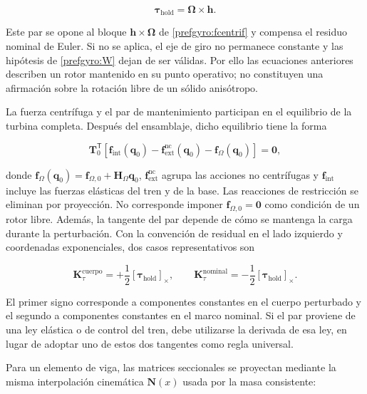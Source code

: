 \begin{equation}
 \bm\tau_{\mathrm{hold}}=\bm\Omega\times\bm h.
 \label{prefgyro:holding}
\end{equation}

Este par se opone al bloque $\bm h\times\bm\Omega$ de
\eqref{prefgyro:fcentrif} y compensa el residuo nominal de Euler. Si no se
aplica, el eje de giro no permanece constante y las hipótesis de
\eqref{prefgyro:W} dejan de ser
válidas. Por ello las ecuaciones anteriores describen un rotor mantenido en su
punto operativo; no constituyen una afirmación sobre la rotación libre de un
sólido anisótropo.

La fuerza centrífuga y el par de mantenimiento participan en el equilibrio de
la turbina completa. Después del ensamblaje, dicho equilibrio tiene la forma

\begin{equation}
 \bm T_0^{\mathsf T}\left[
 \bm f_{\mathrm{int}}(\bm q_0)
 -\bm f_{\mathrm{ext}}^{\mathrm{nc}}(\bm q_0)
 -\bm f_{\Omega}(\bm q_0)\right]=\bm 0,
 \label{prefgyro:equilibrio-nominal}
\end{equation}

donde $\bm f_{\Omega}(\bm q_0)=\bm f_{\Omega,0}+\bm H_\Omega\bm q_0$,
$\bm f_{\mathrm{ext}}^{\mathrm{nc}}$ agrupa las acciones no centrífugas y
$\bm f_{\mathrm{int}}$ incluye las fuerzas elásticas del tren y de la base.
Las reacciones de restricción se eliminan por proyección. No corresponde imponer
$\bm f_{\Omega,0}=\bm 0$ como condición de un rotor libre. Además, la tangente
del par depende de cómo se mantenga la carga durante la perturbación. Con la
convención de residual en el lado izquierdo y coordenadas exponenciales, dos
casos representativos son

\begin{equation}
 \bm K_{\tau}^{\mathrm{cuerpo}}
 =+\frac12[\bm\tau_{\mathrm{hold}}]_\times,
 \qquad
 \bm K_{\tau}^{\mathrm{nominal}}
 =-\frac12[\bm\tau_{\mathrm{hold}}]_\times.
 \label{prefgyro:holding-tangent}
\end{equation}

El primer signo corresponde a componentes constantes en el cuerpo perturbado y
el segundo a componentes constantes en el marco nominal. Si el par proviene de
una ley elástica o de control del tren, debe utilizarse la derivada de esa ley,
en lugar de adoptar uno de estos dos tangentes como regla universal.

Para un elemento de viga, las matrices seccionales se proyectan mediante la
misma interpolación cinemática $\bm N(x)$ usada por la masa consistente:

